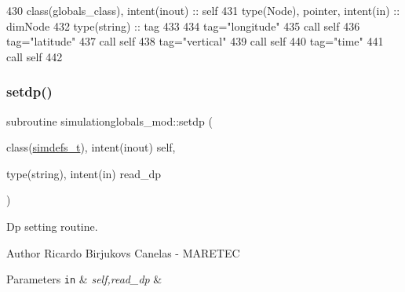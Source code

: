 \begin{DoxyCode}
430     \textcolor{keywordtype}{class}(globals\_class), \textcolor{keywordtype}{intent(inout)} :: self
431     \textcolor{keywordtype}{type}(Node), \textcolor{keywordtype}{pointer}, \textcolor{keywordtype}{intent(in)} :: dimNode
432     \textcolor{keywordtype}{type}(string) :: tag
433 
434     tag=\textcolor{stringliteral}{"longitude"}
435     \textcolor{keyword}{call }self%
436     tag=\textcolor{stringliteral}{"latitude"}
437     \textcolor{keyword}{call }self%
438     tag=\textcolor{stringliteral}{"vertical"}
439     \textcolor{keyword}{call }self%
440     tag=\textcolor{stringliteral}{"time"}
441     \textcolor{keyword}{call }self%
442 
\end{DoxyCode}
\mbox{\label{namespacesimulationglobals__mod_afda1e73e6e0cd075875c70aded99d425}} 
\subsubsection{\texorpdfstring{setdp()}{setdp()}}
{\footnotesize\ttfamily subroutine simulationglobals\+\_\+mod\+::setdp (\begin{DoxyParamCaption}\item[{class(\mbox{\hyperlink{structsimulationglobals__mod_1_1simdefs__t}{simdefs\+\_\+t}}), intent(inout)}]{self,  }\item[{type(string), intent(in)}]{read\+\_\+dp }\end{DoxyParamCaption})\hspace{0.3cm}{\ttfamily [private]}}



Dp setting routine. 

\begin{DoxyAuthor}{Author}
Ricardo Birjukovs Canelas -\/ M\+A\+R\+E\+T\+EC 
\end{DoxyAuthor}

\begin{DoxyParams}[1]{Parameters}
\mbox{\tt in}  & {\em self,read\+\_\+dp} & \\
\hline
\end{DoxyParams}


